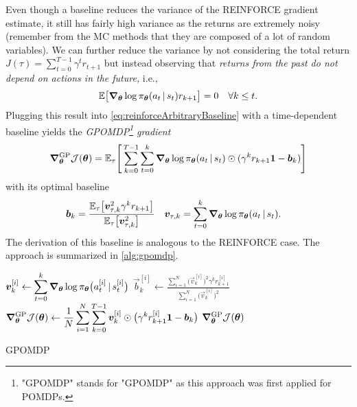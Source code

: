 			Even though a baseline reduces the variance of the REINFORCE gradient estimate, it still has fairly high variance as the returns are extremely noisy (remember from the \ac{MC} methods that they are composed of a lot of random variables). We can further reduce the variance by not considering the total return \( J(\tau) = \sum_{t = 0}^{T - 1} \gamma^t r_{t + 1} \) but instead observing that \emph{returns from the past do not depend on actions in the future,} i.e.,
			\begin{equation}
				\mathbb{E}\bigl[ \grad_{\bm{\theta}} \log \pi_{\bm{\theta}}(a_t \,\vert\, s_t) r_{k + 1} \bigr] = 0 \quad\forall k \leq t.
			\end{equation}
			Plugging this result into \eqref{eq:reinforceArbitraryBaseline} with a time-dependent baseline yields the \emph{\ac{GPOMDP}\footnote{"\acs{GPOMDP}" stands for "\acl{GPOMDP}" as this approach was first applied for \acp{POMDP}.} gradient}
			\begin{equation}
				\grad_{\bm{\theta}}^\mathrm{GP} \mathcal{J}(\bm{\theta})
				= \mathbb{E}_\tau\Biggl[\, \sum_{k = 0}^{T - 1} \sum_{t = 0}^{k} \grad_{\bm{\theta}} \log \pi_{\bm{\theta}}(a_t \,\vert\, s_t) \odot ( \gamma^k r_{k + 1} \bm{1} - \bm{b}_k ) \Biggr]
			\end{equation}
			with its optimal baseline
			\begin{align}
				\bm{b}_k         & = \frac{\mathbb{E}_\tau\bigl[ \bm{v}_{\tau, k}^2 \gamma^k r_{k + 1} \bigr]}{\mathbb{E}_\tau\bigl[ \bm{v}_{\tau, k}^2 \bigr]} &
				\bm{v}_{\tau, k} & = \sum_{t = 0}^{k} \grad_{\bm{\theta}} \log \pi_{\bm{\theta}}(a_t \,\vert\, s_t).
			\end{align}
			The derivation of this baseline is analogous to the REINFORCE case. The approach is summarized in \autoref{alg:gpomdp}.

			\begin{algorithm}  \DontPrintSemicolon
				\(\displaystyle \bm{v}_k^{[i]} \gets \sum_{t = 0}^{k} \grad_{\bm{\theta}} \log \pi_{\bm{\theta}}\bigl( a_t^{[i]} \,\vert\, s_t^{[i]} \bigr) \) \;
				\(\displaystyle \vec{b}_k^{[i]} \gets \frac{\sum_{i = 1}^{N} \bigl(\vec{v}_k^{[i]}\bigr)^2 \gamma^k r_{k + 1}^{[i]}}{\sum_{i = 1}^{N} \bigl(\vec{v}_k^{[i]}\bigr)^2} \)  \quad{}
				\(\displaystyle \grad_{\bm{\theta}}^\mathrm{GP} \mathcal{J}(\bm{\theta}) \gets \frac{1}{N} \sum_{i = 1}^{N} \sum_{k = 0}^{T - 1} \bm{v}_k^{[i]} \odot \bigl( \gamma^k r_{k + 1}^{[i]} \bm{1} - \bm{b}_k \bigr) \)  \quad{}
				\Return \( \grad_{\bm{\theta}}^\mathrm{GP} \mathcal{J}(\bm{\theta}) \) \;
				\caption{\acs{GPOMDP}}
				\label{alg:gpomdp}
			\end{algorithm}

